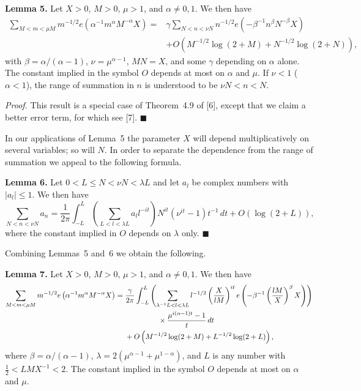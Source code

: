 \documentclass[10pt]{article}
\begin{document}
\medskip
\noindent\textbf{Lemma 5.}
Let $X>0$, $M>0$, $\mu>1$, and $\alpha\ne0,1$. We then have
\[
\begin{aligned}
\sum_{M<m<\mu M}m^{-1/2}
 e\left(\alpha^{-1}m^\alpha M^{-\alpha}X\right)
={}&\gamma\sum_{N<n<\nu N}n^{-1/2}
 e\left(-\beta^{-1}n^\beta N^{-\beta}X\right)\\
&+O\left(M^{-1/2}\log(2+M)+N^{-1/2}\log(2+N)\right),
\end{aligned}
\]
with $\beta=\alpha/(\alpha-1)$, $\nu=\mu^{\alpha-1}$, $MN=X$,
and some $\gamma$ depending on $\alpha$ alone. The constant implied in the
symbol $O$ depends at most on $\alpha$ and $\mu$. If $\nu<1$
($\alpha<1$), the range of summation in $n$ is understood to be
$\nu N<n<N$.

\medskip
\noindent\textit{Proof.}
This result is a special case of Theorem~4.9 of [6], except that we claim a
better error term, for which see [7]. \(\blacksquare\)

In our applications of Lemma~5 the parameter $X$ will depend
multiplicatively on several variables; so will $N$. In order to separate the
dependence from the range of summation we appeal to the following formula.

\medskip
\noindent\textbf{Lemma 6.}
Let $0<L\le N<\nu N<\lambda L$ and let $a_l$ be complex numbers with
$|a_l|\le1$. We then have
\[
\sum_{N<n<\nu N}a_n
 =\frac1{2\pi}\int_{-L}^{L}
   \left(\sum_{L<l<\lambda L}a_l l^{-it}\right)
   N^{it}(\nu^{it}-1)t^{-1}\,dt+O(\log(2+L)),
\]
where the constant implied in $O$ depends on $\lambda$ only.
\(\blacksquare\)

Combining Lemmas~5 and~6 we obtain the following.

\medskip
\noindent\textbf{Lemma 7.}
Let $X>0$, $M>0$, $\mu>1$, and $\alpha\ne0,1$. We then have
\[
\begin{aligned}
\sum_{M<m<\mu M}m^{-1/2}
 e\left(\alpha^{-1}m^\alpha M^{-\alpha}X\right)
={}&\frac{\gamma}{2\pi}\int_{-L}^{L}
 \left(\sum_{\lambda^{-1}L<l<\lambda L}
 l^{-1/2}\left(\frac{X}{lM}\right)^{it}
 e\left(-\beta^{-1}\left(\frac{lM}{X}\right)^\beta X\right)\right)\\
&\hspace{4.5em}\times
 \frac{\mu^{i(\alpha-1)t}-1}{t}\,dt\\
&+O\left(M^{-1/2}\log(2+M)+L^{-1/2}\log(2+L)\right),
\end{aligned}
\]
where $\beta=\alpha/(\alpha-1)$,
$\lambda=2(\mu^{\alpha-1}+\mu^{1-\alpha})$, and $L$ is any number with
$\frac12<LMX^{-1}<2$. The constant implied in the symbol $O$ depends at
most on $\alpha$ and $\mu$.
\end{document}
